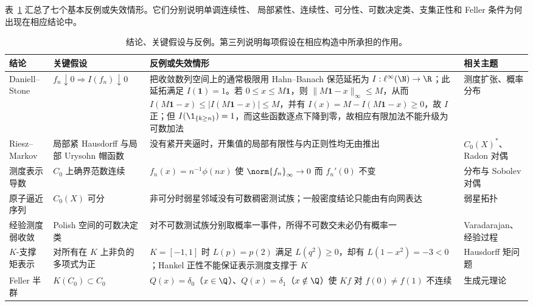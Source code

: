 \begin{remark}[假设的必要性]
表~\ref{tab:7-4-3-assumptions-counterexamples} 汇总了七个基本反例或失效情形。它们分别说明单调连续性、
局部紧性、连续性、可分性、可数决定类、支集正性和 Feller 条件为何出现在相应结论中。
\end{remark}

\begin{table}[htbp]
\centering
\small
\begin{tabularx}{\textwidth}{>{\raggedright\arraybackslash}p{}
 >{\raggedright\arraybackslash}p{}
 >{\raggedright\arraybackslash}p{}
 >{\raggedright\arraybackslash}X}
\toprule
结论 & 关键假设 & 反例或失效情形 & 相关主题 \\
\midrule
Daniell--Stone & $f_n\downarrow0\Rightarrow I(f_n)\downarrow0$
& 把收敛数列空间上的通常极限用 Hahn--Banach 保范延拓为
$I:\ell^\infty(\N)\to\R$；此延拓满足 $I(\mathbf 1)=1$。若 $0\le x\le M\mathbf 1$，则
$\|M\mathbf 1-x\|_\infty\le M$，从而
$I(M\mathbf 1-x)\le |I(M\mathbf 1-x)|\le M$，并有
$I(x)=M-I(M\mathbf 1-x)\ge0$，故 $I$ 正；但
$I(\1_{\{k\ge n\}})=1$，而这些函数逐点下降到零，故相应有限加法不能升级为可数加法
& 测度扩张、概率分布 \\
Riesz--Markov & 局部紧 Hausdorff 与局部 Urysohn 帽函数
& 没有紧开夹逼时，开集值的局部有限性与内正则性均无由推出
& $C_0(X)^*$、Radon 对偶 \\
测度表示导数 & $C_0$ 上确界范数连续
& $f_n(x)=n^{-1}\phi(nx)$ 使 $\norm{f_n}_\infty\to0$ 而 $f_n'(0)$ 不变
& 分布与 Sobolev 对偶 \\
原子逼近序列 & $C_0(X)$ 可分
& 非可分时弱星邻域没有可数稠密测试族；一般密度结论只能由有向网表达
& 弱星拓扑 \\
经验测度弱收敛 & Polish 空间的可数决定类
& 对不可数测试族分别取概率一事件，所得不可数交未必仍有概率一
& Varadarajan、经验过程 \\
$K$-支撑矩表示 & 对所有在 $K$ 上非负的多项式为正
& $K=[-1,1]$ 时 $L(p)=p(2)$ 满足 $L(q^2)\ge0$，却有
$L(1-x^2)=-3<0$；Hankel 正性不能保证表示测度支撑于 $K$
& Hausdorff 矩问题 \\
Feller 半群 & $K(C_0)\subset C_0$
& $Q(x)=\delta_0$（$x\in\Q$）、$Q(x)=\delta_1$（$x\notin\Q$）使
$Kf$ 对 $f(0)\ne f(1)$ 不连续
& 生成元理论 \\
\bottomrule
\end{tabularx}
\caption{结论、关键假设与反例。第三列说明每项假设在相应构造中所承担的作用。}
\label{tab:7-4-3-assumptions-counterexamples}
\end{table}

